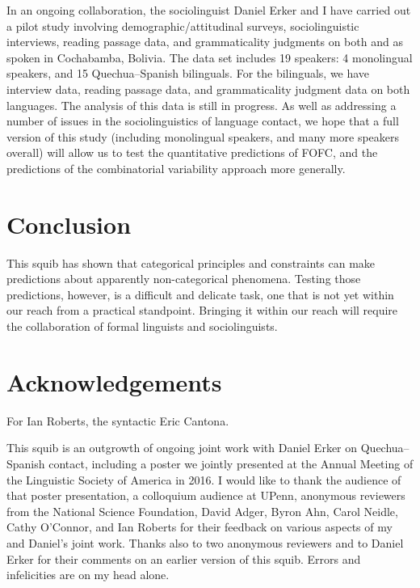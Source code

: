 \documentclass[output=paper]{langsci/langscibook}
\begin{document}
In an ongoing collaboration, the sociolinguist Daniel Erker
and I have carried out a pilot study involving demographic/attitudinal surveys,
sociolinguistic interviews, reading passage data, and grammaticality judgments
on both  and  as spoken in Cochabamba, Bolivia.  The data set
includes 19 speakers: 4 monolingual  speakers, and 15 Quechua--Spanish
bilinguals.  For the bilinguals, we have interview data, reading passage data,
and grammaticality judgment data on both languages.     The analysis of this
data is still in progress.  As well as addressing a number of issues in the
sociolinguistics of language contact, we hope that a full version of this study
(including monolingual  speakers, and many more speakers overall) will
allow us to test the quantitative predictions of FOFC, and the predictions of
the combinatorial variability approach more generally.

\section{Conclusion}\label{sec-30:key:4}

This squib has shown that categorical principles and constraints can make
predictions about apparently non-categorical phenomena.  Testing those
predictions, however, is a difficult and delicate task, one that is not yet
within our reach from a practical standpoint.  Bringing it within our reach
will require the collaboration of formal linguists and sociolinguists.

\printchapterglossary{}

\section*{Acknowledgements}

For Ian Roberts, the syntactic Eric Cantona.

This squib is an outgrowth of ongoing joint work with Daniel Erker on
Quechua--Spanish contact, including a poster we jointly presented at the Annual
Meeting of the Linguistic Society of America in 2016. I would like to thank the
audience of that poster presentation, a colloquium audience at UPenn, anonymous
reviewers from the National Science Foundation, David Adger, Byron Ahn, Carol
Neidle, Cathy O’Connor, and Ian Roberts for their feedback on various aspects
of my and Daniel’s joint work. Thanks also to two anonymous reviewers and to
Daniel Erker for their comments on an earlier version of this squib. Errors and
infelicities are on my head alone.

{\sloppy
\printbibliography[heading=subbibliography,notkeyword=this]
}
\end{document}
